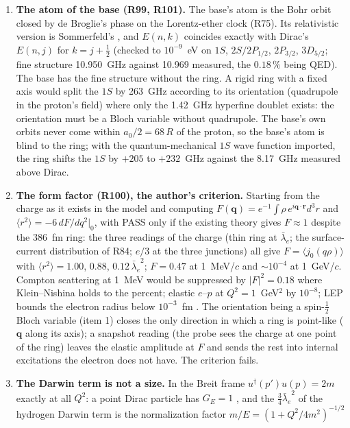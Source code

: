 \documentclass[11pt,a4paper]{article}
\theoremstyle{plain}
\theoremstyle{remark}
\newcommand{\lb}{\ensuremath{\bar\lambda_e}}
\begin{document}
\begin{enumerate}[nosep]
\item \textbf{The atom of the base (R99, R101).} The base's atom is the Bohr orbit closed by de
Broglie's phase on the Lorentz-ether clock (R75). Its relativistic version is Sommerfeld's
\cite{sommerfeld}, and $E(n,k)$ coincides exactly with Dirac's $E(n,j)$ for $k = j + \tfrac12$
(checked to $10^{-9}$~eV on $1S$, $2S/2P_{1/2}$, $2P_{3/2}$, $3D_{5/2}$; fine structure 10.950~GHz
against 10.969 measured, the $0.18\,\%$ being QED). The base has the fine structure without the
ring. A rigid ring with a fixed axis would split the $1S$ by 263~GHz according to its orientation
(quadrupole in the proton's field) where only the 1.42~GHz hyperfine doublet exists: the
orientation must be a Bloch variable without quadrupole. The base's own orbits never come within
$a_0/2 = 68\,R$ of the proton, so the base's atom is blind to the ring; with the quantum-mechanical
$1S$ wave function imported, the ring shifts the $1S$ by $+205$ to $+232$~GHz against the 8.17~GHz
measured above Dirac.
\item \textbf{The form factor (R100), the author's criterion.} Starting from the charge as it
exists in the model and computing $F(\mathbf q) = e^{-1}\!\int\rho\,e^{i\mathbf q\cdot\mathbf r}d^3r$
and $\langle r^2\rangle = -6\,dF/dq^2|_0$, with PASS only if the existing theory gives
$F \approx 1$ despite the 386~fm ring: the three readings of the charge (thin ring at $\lb$; the
surface-current distribution of R84; $e/3$ at the three junctions) all give $F = \langle
j_0(q\rho)\rangle$ with $\langle r^2\rangle = 1.00$, $0.88$, $0.12\,\lb^2$; $F = 0.47$ at
1~MeV/$c$ and $\sim 10^{-4}$ at 1~GeV/$c$. Compton scattering at 1~MeV would be suppressed by
$|F|^2 = 0.18$ where Klein--Nishina \cite{kleinnishina} holds to the percent; elastic $e$--$p$ at
$Q^2 = 1$~GeV$^2$ by $10^{-8}$; LEP bounds the electron radius below $10^{-3}$~fm \cite{pdg}. The
orientation being a spin-$\tfrac12$ Bloch variable (item 1) closes the only direction in which a
ring is point-like ($\mathbf q$ along its axis); a snapshot reading (the probe sees the charge at
one point of the ring) leaves the elastic amplitude at $F$ and sends the rest into internal
excitations the electron does not have. The criterion fails.
\item \textbf{The Darwin term is not a size.} In the Breit frame $u^\dagger(p')u(p) = 2m$ exactly
at all $Q^2$: a point Dirac particle has $G_E = 1$ \cite{sachs}, and the $\tfrac34\lb^2$ of the
hydrogen Darwin term is the normalization factor $m/E = (1 + Q^2/4m^2)^{-1/2}$

\end{enumerate}
\end{document}

